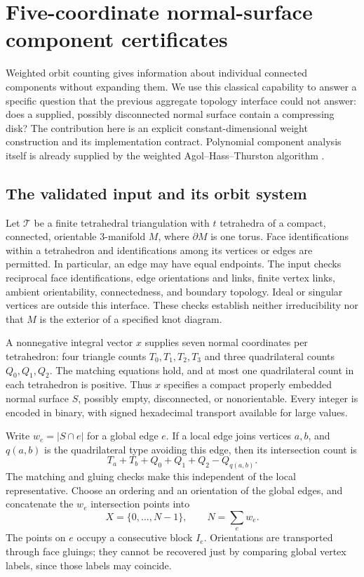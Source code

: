 \section{Five-coordinate normal-surface component certificates}
\label{nc:section}

Weighted orbit counting gives information about individual connected
components without expanding them.  We use this classical capability to
answer a specific question that the previous aggregate topology interface
could not answer: does a supplied, possibly disconnected normal surface
contain a compressing disk?  The contribution here is an explicit
constant-dimensional weight construction and its implementation contract.
Polynomial component analysis itself is already supplied by the weighted
Agol--Hass--Thurston algorithm \cite{AHT2006}.

\subsection{The validated input and its orbit system}
\label{nc:input}

Let $\mathcal T$ be a finite tetrahedral triangulation with $t$ tetrahedra
of a compact, connected, orientable $3$-manifold $M$, where $\partial M$
is one torus.  Face identifications within a tetrahedron and identifications
among its vertices or edges are permitted.  In particular, an edge may
have equal endpoints.  The input checks reciprocal face identifications,
edge orientations and links, finite vertex links, ambient orientability,
connectedness, and boundary topology.  Ideal or singular vertices are
outside this interface.  These checks establish neither irreducibility
nor that $M$ is the exterior of a specified knot diagram.

A nonnegative integral vector $x$ supplies seven normal coordinates per
tetrahedron: four triangle counts $T_0,T_1,T_2,T_3$ and three
quadrilateral counts $Q_0,Q_1,Q_2$.  The matching equations hold, and
at most one quadrilateral count in each tetrahedron is positive.  Thus
$x$ specifies a compact properly embedded normal surface $S$, possibly
empty, disconnected, or nonorientable.  Every integer is encoded in
binary, with signed hexadecimal transport available for large values.

Write $w_e=|S\cap e|$ for a global edge $e$.  If a local edge joins
vertices $a,b$, and $q(a,b)$ is the quadrilateral type avoiding this
edge, then its intersection count is
\[
 T_a+T_b+Q_0+Q_1+Q_2-Q_{q(a,b)}.
\]
The matching and gluing checks make this independent of the local
representative.  Choose an ordering and an orientation of the global
edges, and concatenate the $w_e$ intersection points into
\[
 X=\{0,\ldots,N-1\},\qquad N=\sum_e w_e.
\]
The points on $e$ occupy a consecutive block $I_e$.  Orientations are
transported through face gluings; they cannot be recovered just by
comparing global vertex labels, since those labels may coincide.


